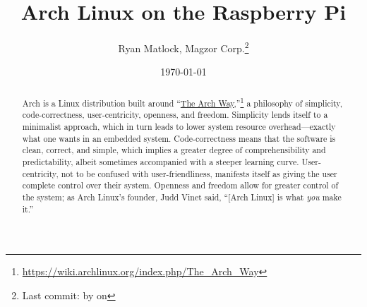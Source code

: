 \documentclass[12pt,letterpaper]{article}
\newcommand\gittext[1]{\texttt{#1}}
\begin{document}
\title{Arch Linux on the Raspberry Pi}
\author{Ryan Matlock, Magzor Corp.\thanks{Last commit: \gittext{\gitAbbrevHash} by \gittext{\gitAuthorName} on \gittext{\gitAuthorIsoDate}}}
\date{\today}
\maketitle

\begin{abstract}
Arch is a Linux distribution built around ``\href{https://wiki.archlinux.org/index.php/The_Arch_Way}{The Arch Way},''\footnote{\url{https://wiki.archlinux.org/index.php/The_Arch_Way}} a philosophy of simplicity, code-correctness, user-centricity, openness, and freedom.  Simplicity lends itself to a minimalist approach, which in turn leads to lower system resource overhead---exactly what one wants in an embedded system.  Code-correctness means that the software is clean, correct, and simple, which implies a greater degree of comprehensibility and predictability, albeit sometimes accompanied with a steeper learning curve.  User-centricity, not to be confused with user-friendliness, manifests itself as giving the user complete control over their %
system.  %
Openness and freedom allow for greater control of the system; as Arch Linux's founder, Judd Vinet said, ``[Arch Linux] is what \emph{you} make it.''
\end{abstract}

\tableofcontents


\end{document}
